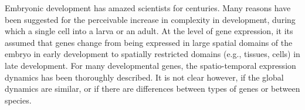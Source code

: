 
Embryonic development has amazed scientists for centuries.
%
Many reasons have been suggested for the perceivable increase in complexity in development, during which a single cell into a larva or an adult.
%
%
At the level of gene expression, 
it its assumed that genes change from being expressed in large spatial domains of the embryo in early development to spatially restricted domains (e.g., tissues, cells) in late development.
%
For many developmental genes, the spatio-temporal expression dynamics
has been thoroughly described.
It is not clear however, if the global dynamics are similar,
or if there are differences between types of genes or between species.

